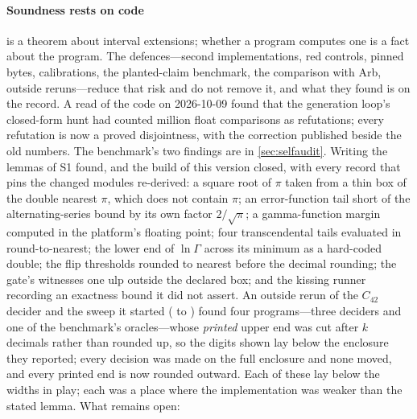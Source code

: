 \documentclass[preprint,11pt,a4paper]{elsarticle}
\theoremstyle{definition}
\newcommand{\supp}[1]{S#1}
\begin{document}
\paragraph{Soundness rests on code}  is a theorem about interval extensions; whether a program computes one is a fact about the program. The defences---second implementations, red controls, pinned bytes, calibrations, the planted-claim benchmark, the comparison with Arb, outside reruns---reduce that risk and do not remove it, and what they found is on the record. A read of the code on 2026-10-09 found that the generation loop's closed-form hunt had counted \MtErrFloatMillions{} million float comparisons as refutations; every refutation is now a proved disjointness, with the correction published beside the old numbers. The benchmark's two findings are in \cref{sec:selfaudit}. Writing the lemmas of \supp{1} found, and the build of this version closed, with every record that pins the changed modules re-derived: a square root of $\pi$ taken from a thin box of the double nearest $\pi$, which does not contain $\pi$; an error-function tail short of the alternating-series bound by its own factor $2/\sqrt\pi$; a gamma-function margin computed in the platform's floating point; four transcendental tails evaluated in round-to-nearest; the lower end of $\ln\Gamma$ across its minimum as a hard-coded double; the flip thresholds rounded to nearest before the decimal rounding; the gate's witnesses one ulp outside the declared box; and the kissing runner recording an exactness bound it did not assert. An outside rerun of the $C_{42}$ decider and the sweep it started (\MtSaAmendPrintFirst{} to \MtSaAmendLast) found four programs---three deciders and one of the benchmark's oracles---whose \emph{printed} upper end was cut after $k$ decimals rather than rounded up, so the digits shown lay below the enclosure they reported; every decision was made on the full enclosure and none moved, and every printed end is now rounded outward. Each of these lay below the widths in play; each was a place where the implementation was weaker than the stated lemma. What remains open:
\end{document}
